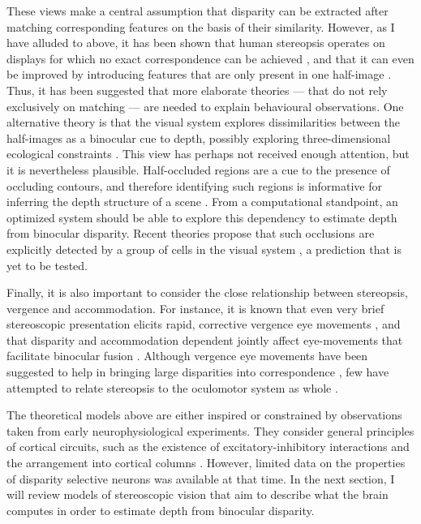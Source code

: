 These views make a central assumption that disparity can be extracted after matching corresponding features on the basis of their similarity. However, as I have alluded to above, it has been shown that human stereopsis operates on displays for which no exact correspondence can be achieved \cite{Kaye:1978os,Mayhew:1976ys}, and that it can even be improved by introducing features that are only present in one half-image \cite{Gillam:1999il,Anderson:1994fk,Nakayama:1990fc,Shimojo:1990uq,Gillam:1988lo}. Thus, it has been suggested that more elaborate theories --- that do not rely exclusively on matching --- are needed to explain behavioural observations. One alternative theory is that the visual system explores dissimilarities between the half-images as a binocular cue to depth, possibly exploring three-dimensional ecological constraints \cite{Anderson:1994fk,Nakayama:1990fc,Shimojo:1990uq}. This view has perhaps not received enough attention, but it is nevertheless plausible. Half-occluded regions are a cue to the presence of occluding contours, and therefore identifying such regions is informative for inferring the depth structure of a scene \cite{belhumeur1992bayesian,belhumeur1996bayesian,Anderson:1994qc,Anderson:1994fk,anderson1995theoretical}. From a computational standpoint, an optimized system should be able to explore this dependency to estimate depth from binocular disparity. Recent theories propose that such occlusions are explicitly detected by a group of cells in the visual system \cite{Tsirlin2014}, a prediction that is yet to be tested.   

Finally, it is also important to consider the close relationship between stereopsis, vergence and accommodation. For instance, it is known that even very brief stereoscopic presentation elicits rapid, corrective vergence eye movements \cite{Masson:1997jq}, and that disparity and accommodation dependent jointly affect eye-movements that facilitate binocular fusion \cite{Maiello:2014nu}. Although vergence eye movements have been suggested to help in bringing large disparities into correspondence \cite{Marr:1979lh,Grimson:1981bs}, few have attempted to relate stereopsis to the oculomotor system as whole \cite{Sperling:1970ys}.

The theoretical models above are either inspired or constrained by observations taken from early neurophysiological experiments. They consider general principles of cortical circuits, such as the existence of excitatory-inhibitory interactions \cite{Sperling:1970ys,DEV1975511,Marr:1976dq} and the arrangement into cortical columns \cite{Nelson:1975oq}. However, limited data on the properties of disparity selective neurons was available at that time. In the next section, I will review models of stereoscopic vision that aim to describe what the brain computes in order to estimate depth from binocular disparity.

